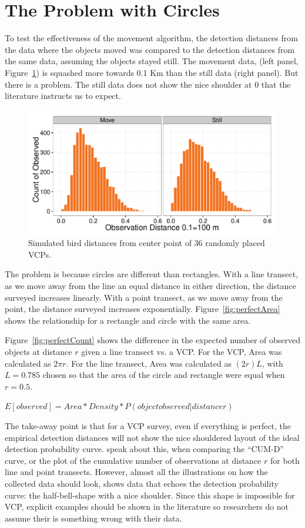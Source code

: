 \documentclass[12pt]{article}
\begin{document}
\section{The Problem with Circles}
To test the effectiveness of the movement algorithm, the detection distances from the data where the objects moved was compared to the detection distances from the same data, assuming the objects stayed still. The movement data, (left panel, Figure~\ref{fig:moveTest}) is squashed more towards 0.1 Km than the still data (right panel). But there is a problem. The still data does not show the nice shoulder at 0 that the literature instructs us to expect.

\begin{figure}[h]
	\center
	\includegraphics[width=\textwidth]{../images/movementTest.pdf}
	\caption{Simulated bird distances from center point of 36 randomly placed VCPs.\label{fig:moveTest}}
\end{figure}

The problem is because circles are different than rectangles. With a line transect, as we move away from the line an equal distance in either direction, the distance surveyed increases linearly. With a point transect, as we move away from the point, the distance surveyed increases exponentially. Figure~\ref{fig:perfectArea} shows the relationship for a rectangle and circle with the same area. 

Figure~\ref{fig:perfectCount} shows the difference in the expected number of observed objects at distance $r$ given a line transect vs. a VCP. For the VCP, Area was calculated as $2\pi r$. For the line transect, Area was calculated as $(2r)L$, with $L=0.785$ chosen so that the area of the circle and rectangle were equal when $r=0.5$.

$E[observed] = Area*Density*P(object observed | distance r)$

The take-away point is that for a VCP survey, even if everything is perfect, the empirical detection distances will not show the nice shouldered layout of the ideal detection probability curve. \textcite{ramsey1981} speak about this, when comparing the ``CUM-D'' curve, or the plot of the cumulative number of observations at distance $r$ for both line and point transects. However, almost all the illustrations on how the collected data should look, shows data that echoes the detection probability curve: the half-bell-shape with a nice shoulder. Since this shape is impossible for VCP, explicit examples should be shown in the literature so researchers do not assume their is something wrong with their data.
\end{document}
